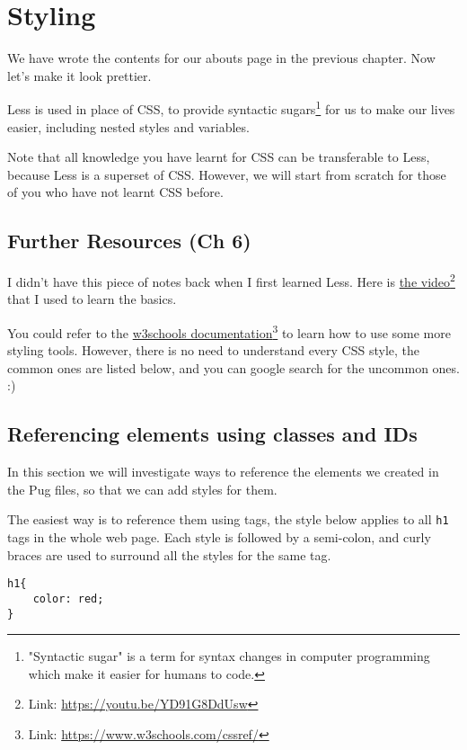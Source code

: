 \chapter{Styling}
\label{sec:ch6}

We have wrote the contents for our abouts page in the previous chapter. Now let's make it look prettier.
\vspace{6mm}

Less is used in place of CSS, to provide syntactic sugars\footnote{"Syntactic sugar" is a term for syntax changes in computer programming which make it easier for humans to code.} for us to make our lives easier, including nested styles and variables. 

Note that all knowledge you have learnt for CSS can be transferable to Less, because Less is a superset of CSS. However, we will start from scratch for those of you who have not learnt CSS before.

\section{Further Resources (Ch 6)}

I didn't have this piece of notes back when I first learned Less. Here is \href{https://youtu.be/YD91G8DdUsw}{the video}\footnote{Link: \url{https://youtu.be/YD91G8DdUsw}} that I used to learn the basics. 

You could refer to the \href{https://www.w3schools.com/cssref/}{w3schools documentation}\footnote{Link: \url{https://www.w3schools.com/cssref/}} to learn how to use some more styling tools. However, there is no need to understand every CSS style, the common ones are listed below, and you can google search for the uncommon ones. :)

\section{Referencing elements using classes and IDs}

In this section we will investigate ways to reference the elements we created in the Pug files, so that we can add styles for them.

The easiest way is to reference them using tags, the style below applies to all \texttt{h1} tags in the whole web page. Each style is followed by a semi-colon, and curly braces are used to surround all the styles for the same tag.

\begin{lstlisting}[language=pug]
h1{
    color: red;
}
\end{lstlisting}

